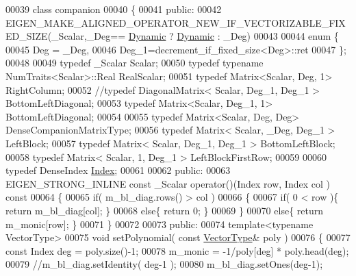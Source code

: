 \begin{DoxyCode}
00039 \textcolor{keyword}{class }companion
00040 \{
00041   \textcolor{keyword}{public}:
00042     EIGEN\_MAKE\_ALIGNED\_OPERATOR\_NEW\_IF\_VECTORIZABLE\_FIXED\_SIZE(\_Scalar,\_Deg==
      \hyperlink{namespace_eigen_ad81fa7195215a0ce30017dfac309f0b2}{Dynamic} ? \hyperlink{namespace_eigen_ad81fa7195215a0ce30017dfac309f0b2}{Dynamic} : \_Deg)
00043 
00044     \textcolor{keyword}{enum} \{
00045       Deg = \_Deg,
00046       Deg\_1=decrement\_if\_fixed\_size<Deg>::ret
00047     \};
00048 
00049     \textcolor{keyword}{typedef} \_Scalar                                Scalar;
00050     \textcolor{keyword}{typedef} \textcolor{keyword}{typename} NumTraits<Scalar>::Real       RealScalar;
00051     \textcolor{keyword}{typedef} Matrix<Scalar, Deg, 1>                 RightColumn;
00052     \textcolor{comment}{//typedef DiagonalMatrix< Scalar, Deg\_1, Deg\_1 > BottomLeftDiagonal;}
00053     \textcolor{keyword}{typedef} Matrix<Scalar, Deg\_1, 1>               BottomLeftDiagonal;
00054 
00055     \textcolor{keyword}{typedef} Matrix<Scalar, Deg, Deg>               DenseCompanionMatrixType;
00056     \textcolor{keyword}{typedef} Matrix< Scalar, \_Deg, Deg\_1 >          LeftBlock;
00057     \textcolor{keyword}{typedef} Matrix< Scalar, Deg\_1, Deg\_1 >         BottomLeftBlock;
00058     \textcolor{keyword}{typedef} Matrix< Scalar, 1, Deg\_1 >             LeftBlockFirstRow;
00059 
00060     \textcolor{keyword}{typedef} DenseIndex \hyperlink{namespace_eigen_a62e77e0933482dafde8fe197d9a2cfde}{Index};
00061 
00062   \textcolor{keyword}{public}:
00063     EIGEN\_STRONG\_INLINE \textcolor{keyword}{const} \_Scalar operator()(Index row, Index col )\textcolor{keyword}{ const}
00064 \textcolor{keyword}{    }\{
00065       \textcolor{keywordflow}{if}( m\_bl\_diag.rows() > col )
00066       \{
00067         \textcolor{keywordflow}{if}( 0 < row )\{ \textcolor{keywordflow}{return} m\_bl\_diag[col]; \}
00068         \textcolor{keywordflow}{else}\{ \textcolor{keywordflow}{return} 0; \}
00069       \}
00070       \textcolor{keywordflow}{else}\{ \textcolor{keywordflow}{return} m\_monic[row]; \}
00071     \}
00072 
00073   \textcolor{keyword}{public}:
00074     \textcolor{keyword}{template}<\textcolor{keyword}{typename} VectorType>
00075     \textcolor{keywordtype}{void} setPolynomial( \textcolor{keyword}{const} \hyperlink{struct_vector_type}{VectorType}& poly )
00076     \{
00077       \textcolor{keyword}{const} Index deg = poly.size()-1;
00078       m\_monic = -1/poly[deg] * poly.head(deg);
00079       \textcolor{comment}{//m\_bl\_diag.setIdentity( deg-1 );}
00080       m\_bl\_diag.setOnes(deg-1);

\end{DoxyCode}

